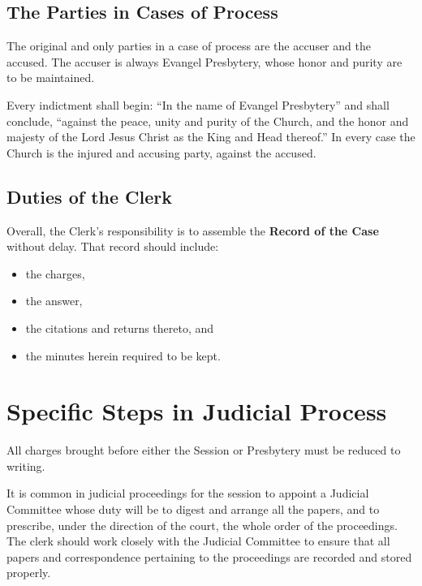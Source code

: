 \documentclass[
]{book}
\providecommand{\tightlist}{%
  \setlength{\itemsep}{0pt}\setlength{\parskip}{0pt}}
\begin{document}
\hypertarget{the-parties-in-cases-of-process}{%
\subsection{The Parties in Cases of Process}\label{the-parties-in-cases-of-process}}

The original and only parties in a case of process are the accuser and the accused. The accuser is always Evangel Presbytery, whose honor and purity are to be maintained.

Every indictment shall begin: ``In the name of Evangel Presbytery'' and shall conclude, ``against the peace, unity and purity of the Church, and the honor and majesty of the Lord Jesus Christ as the King and Head thereof.'' In every case the Church is the injured and accusing party, against the accused.

\hypertarget{duties-of-the-clerk}{%
\subsection{Duties of the Clerk}\label{duties-of-the-clerk}}

Overall, the Clerk's responsibility is to assemble the \textbf{Record of the Case} without delay. That record should include:

\begin{itemize}
\tightlist
\item
  the charges,
\item
  the answer,
\item
  the citations and returns thereto, and
\item
  the minutes herein required to be kept.
\end{itemize}

\hypertarget{specific-steps-in-judicial-process}{%
\section{Specific Steps in Judicial Process}\label{specific-steps-in-judicial-process}}

All charges brought before either the Session or Presbytery must be reduced to writing.

It is common in judicial proceedings for the session to appoint a Judicial Committee whose duty will be to digest and arrange all the papers, and to prescribe, under the direction of the court, the whole order of the proceedings. The clerk should work closely with the Judicial Committee to ensure that all papers and correspondence pertaining to the proceedings are recorded and stored properly.
\end{document}
